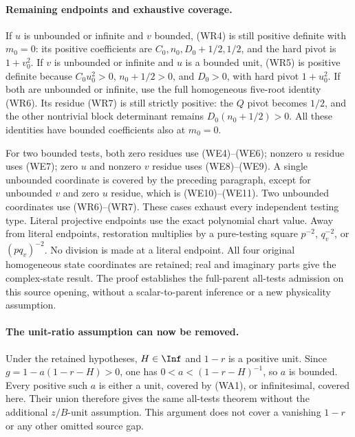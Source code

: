 \paragraph{Remaining endpoints and exhaustive coverage.}
If $u$ is unbounded or infinite and $v$ bounded, (WR4) is still
positive definite with $m_0=0$: its positive coefficients are
$C_0,n_0,D_0+1/2,1/2$, and the hard pivot is $1+v_0^2$.
If $v$ is unbounded or infinite and $u$ is a bounded unit,
(WR5) is positive definite because $C_0u_0^2>0$,
$n_0+1/2>0$, and $D_0>0$, with hard pivot $1+u_0^2$.
If both are unbounded or infinite, use the full homogeneous
five-root identity (WR6). Its residue (WR7) is still strictly
positive: the $Q$ pivot becomes $1/2$, and the other nontrivial
block determinant remains $D_0(n_0+1/2)>0$.
All these identities have bounded coefficients also at $m_0=0$.

For two bounded tests, both zero residues use (WE4)--(WE6);
nonzero $u$ residue uses (WE7); zero $u$ and nonzero $v$ residue
uses (WE8)--(WE9). A single unbounded coordinate is covered by
the preceding paragraph, except for unbounded $v$ and zero $u$
residue, which is (WE10)--(WE11). Two unbounded coordinates use
(WR6)--(WR7). These cases exhaust every independent testing type.
Literal projective endpoints use the exact polynomial chart value.
Away from literal endpoints, restoration multiplies by a
pure-testing square $p^{-2}$, $q_v^{-2}$, or $(pq_v)^{-2}$.
No division is made at a literal endpoint. All four original
homogeneous state coordinates are retained; real and imaginary
parts give the complex-state result. The proof establishes the
full-parent all-tests admission on this source opening, without
a scalar-to-parent inference or a new physicality assumption.

\paragraph{The unit-ratio assumption can now be removed.}
Under the retained hypotheses, $H\in\Inf$ and $1-r$ is a
positive unit. Since $g=1-a(1-r-H)>0$, one has
$0<a<(1-r-H)^{-1}$, so $a$ is bounded. Every positive such
$a$ is either a unit, covered by (WA1), or infinitesimal, covered
here. Their union therefore gives the same all-tests theorem
without the additional $z/B$-unit assumption. This argument does
not cover a vanishing $1-r$ or any other omitted source gap.

